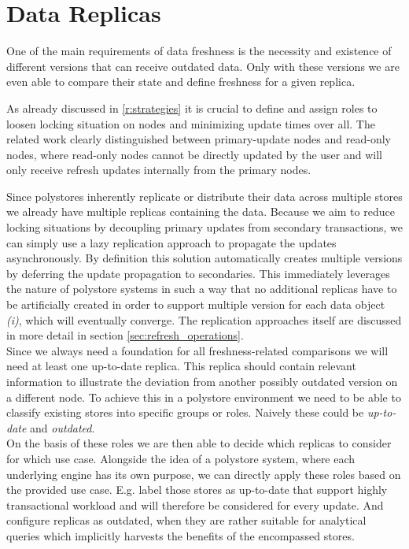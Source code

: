 
\section{Data Replicas}
\label{sec:data_replicas}

One of the main requirements of data freshness is the necessity and existence of different versions that can receive outdated data. 
Only with these versions we are even able to compare their state and define freshness for a given replica.

As already discussed in \ref{r:strategies} it is crucial to define and assign roles to loosen locking situation on nodes
and minimizing update times over all.
The related work clearly distinguished between primary-update nodes and read-only nodes, where 
read-only nodes cannot be directly updated by the user and will only receive refresh updates internally from the primary nodes.

Since polystores inherently replicate or distribute their data across multiple stores we already have multiple replicas containing the data. 
Because we aim to reduce locking situations by decoupling primary updates from secondary transactions,
we can simply use a lazy replication approach to propagate the updates asynchronously. 
By definition this solution automatically creates multiple versions by deferring the update propagation to secondaries.
This immediately leverages the nature of polystore systems in such a way that no additional replicas have to be artificially created in order 
to support multiple version for each data object \textit{(i)}, which will eventually converge. 
The replication approaches itself are discussed in more detail in section \ref{sec:refresh_operations}.\\


Since we always need a foundation for all freshness-related comparisons we will need at least one up-to-date replica. 
This replica should contain relevant information to illustrate the deviation from another possibly outdated version on a different node.
To achieve this in a polystore environment we need to be able to classify existing stores into specific groups or roles.
Naively these could be \emph{up-to-date} and \emph{outdated}.\\
On the basis of these roles we are then able to decide which replicas to consider for which use case.
Alongside the idea of a polystore system, where each underlying engine has its own purpose, we can directly apply these roles 
based on the provided use case. E.g. label those stores as up-to-date that support highly transactional workload and will therefore be considered for every update.
And configure replicas as outdated, when they are rather suitable for analytical queries which implicitly harvests the benefits of the encompassed stores. \\

